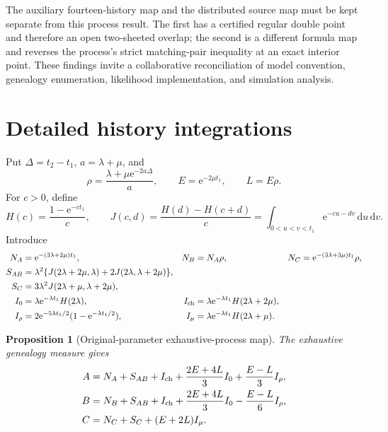 \documentclass[11pt]{article}
\newtheorem{proposition}[theorem]{Proposition}
\newcommand{\e}{\mathrm e}
\newcommand{\dd}{\,\mathrm d}
\begin{document}
The auxiliary fourteen-history map and the distributed source map must be kept separate from this process result.  The first has a certified regular double point and therefore an open two-sheeted overlap; the second is a different formula map and reverses the process's strict matching-pair inequality at an exact interior point.  These findings invite a collaborative reconciliation of model convention, genealogy enumeration, likelihood implementation, and simulation analysis.

\appendix

\section{Detailed history integrations}\label{app:integration}
Put $\Delta=t_2-t_1$, $a=\lambda+\mu$, and
\[
\rho=\frac{\lambda+\mu\e^{-2a\Delta}}{a},
\qquad E=\e^{-2\mu t_1},
\qquad L=E\rho.
\]
For $c>0$, define
\[
H(c)=\frac{1-\e^{-ct_1}}{c},
\qquad
J(c,d)=\frac{H(d)-H(c+d)}{c}
=\int_{0<u<v<t_1}\e^{-cu-dv}\dd u\dd v.
\]
Introduce
\begin{align*}
N_A&=\e^{-(3\lambda+2\mu)t_1},&
N_B&=N_A\rho,&
N_C&=\e^{-(3\lambda+3\mu)t_1}\rho,\\
S_{AB}&=\lambda^2\{J(2\lambda+2\mu,\lambda)
+2J(2\lambda,\lambda+2\mu)\},\\
S_C&=3\lambda^2J(2\lambda+\mu,\lambda+2\mu),\\
I_0&=\lambda\e^{-\lambda t_1}H(2\lambda),&
I_{\rm ch}&=\lambda\e^{-\lambda t_1}H(2\lambda+2\mu),\\
I_\rho&=2\e^{-5\lambda t_1/2}(1-\e^{-\lambda t_1/2}),&
I_\mu&=\lambda\e^{-\lambda t_1}H(2\lambda+\mu).
\end{align*}

\begin{proposition}[Original-parameter exhaustive-process map]\label{prop:original-map}
The exhaustive genealogy measure gives
\begin{align}
A={}&N_A+S_{AB}+I_{\rm ch}
+\frac{2E+4L}{3}I_0+\frac{E-L}{3}I_\rho,\label{eq:Aoriginal}\\
B={}&N_B+S_{AB}+I_{\rm ch}
+\frac{2E+4L}{3}I_0-\frac{E-L}{6}I_\rho,\label{eq:Boriginal}\\
C={}&N_C+S_C+(E+2L)I_\mu.\label{eq:Coriginal}
\end{align}
\end{proposition}
\end{document}
